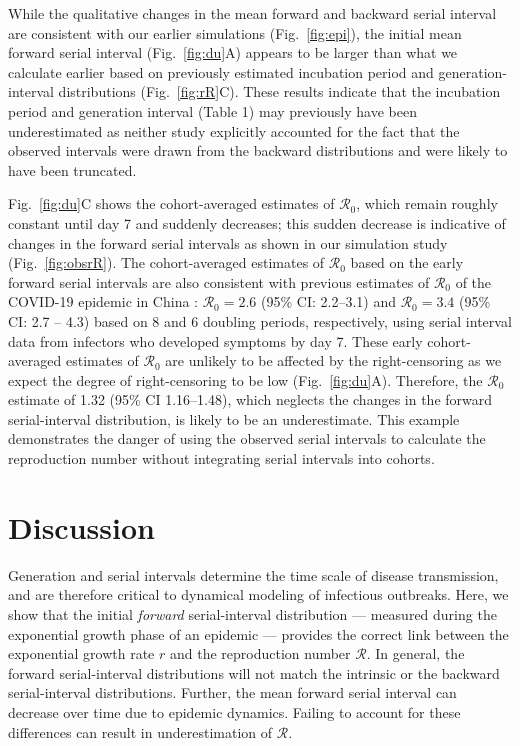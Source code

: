 \documentclass[12pt]{article}
\newcommand{\fref}[1]{Fig.~\ref{fig:#1}}
\newcommand{\Rx}[1]{\ensuremath{{\mathcal R}_{#1}}\xspace}
\newcommand{\Ro}{\Rx{0}}
\newcommand{\RR}{\ensuremath{{\mathcal R}}\xspace}
\begin{document}
While the qualitative changes in the mean forward and backward serial interval are consistent with our earlier simulations (\fref{epi}), the initial mean forward serial interval (\fref{du}A) appears to be larger than what we calculate earlier based on previously estimated incubation period and generation-interval distributions (\fref{rR}C).
These results indicate that the incubation period and generation interval (Table 1) may previously have been underestimated as neither study explicitly accounted for the fact that the observed intervals were drawn from the backward distributions and were likely to have been truncated.

\fref{du}C shows the cohort-averaged estimates of \Ro, which remain roughly constant until day 7 and suddenly decreases;
this sudden decrease is indicative of changes in the forward serial intervals as shown in our simulation study (\fref{obsrR}).
The cohort-averaged estimates of \Ro based on the early forward serial intervals are also consistent with previous estimates of \Ro of the COVID-19 epidemic in China \citep{majumder2020early, park2020reconciling}:
$\Ro = 2.6$ (95\% CI: 2.2--3.1) and $\Ro = 3.4$ (95\% CI: 2.7 -- 4.3) based on 8 and 6 doubling periods, respectively, using serial interval data from infectors who developed symptoms by day 7.
These early cohort-averaged estimates of \Ro are unlikely to be affected by the right-censoring as we expect the degree of right-censoring to be low (\fref{du}A).
Therefore, the \Ro estimate of 1.32 (95\% CI 1.16–1.48), which neglects the changes in the forward serial-interval distribution, is likely to be an underestimate.
This example demonstrates the danger of using the observed serial intervals to calculate the reproduction number without integrating serial intervals into cohorts.

\section{Discussion}

Generation and serial intervals determine the time scale of disease transmission, and are therefore critical to dynamical modeling of infectious outbreaks.
Here, we show that the initial \emph{forward} serial-interval distribution --- measured during the exponential growth phase of an epidemic --- provides the correct link between the exponential growth rate $r$ and the reproduction number \RR.
In general, the forward serial-interval distributions will not match the intrinsic or the backward serial-interval distributions.
Further, the mean forward serial interval can decrease over time due to epidemic dynamics. 
Failing to account for these differences can result in underestimation of \RR.
\end{document}
